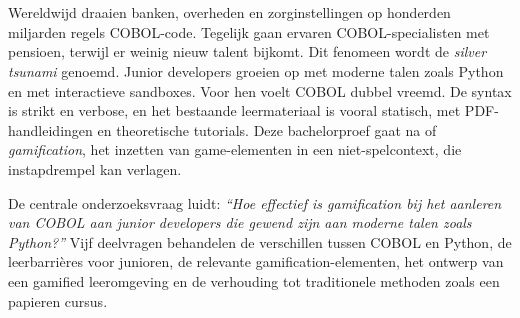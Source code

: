 
%



\chapter*{}

Wereldwijd draaien banken, overheden en zorginstellingen op honderden miljarden regels COBOL-code. Tegelijk gaan ervaren COBOL-specialisten met pensioen, terwijl er weinig nieuw talent bijkomt. Dit fenomeen wordt de \textit{silver tsunami} genoemd. Junior developers groeien op met moderne talen zoals Python en met interactieve sandboxes. Voor hen voelt COBOL dubbel vreemd. De syntax is strikt en verbose, en het bestaande leermateriaal is vooral statisch, met PDF-handleidingen en theoretische tutorials. Deze bachelorproef gaat na of \textit{gamification}, het inzetten van game-elementen in een niet-spelcontext, die instapdrempel kan verlagen.

De centrale onderzoeksvraag luidt: \textit{\enquote{Hoe effectief is gamification bij het aanleren van COBOL aan junior developers die gewend zijn aan moderne talen zoals Python?}} Vijf deelvragen behandelen de verschillen tussen COBOL en Python, de leerbarrières voor junioren, de relevante gamification-elementen, het ontwerp van een gamified leeromgeving en de verhouding tot traditionele methoden zoals een papieren cursus.

